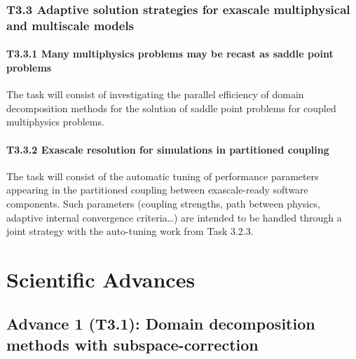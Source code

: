 \subsubsection*{T3.3 Adaptive solution strategies for exascale multiphysical and multiscale models}
\paragraph*{T3.3.1 Many multiphysics problems may be recast as saddle point problems}

 The task will
consist of investigating the parallel efficiency of domain decomposition methods for the solution of
saddle point problems for coupled multiphysics problems.

\paragraph*{T3.3.2 Exascale resolution for simulations in partitioned coupling}

 The task will consist of the
automatic tuning of performance parameters appearing in the partitioned coupling between
exascale-ready software components. Such parameters (coupling strengths, path between physics,
adaptive internal convergence criteria…) are intended to be handled through a joint strategy with the
auto-tuning work from Task 3.2.3.



\section{Scientific Advances}



 \subsection{ 
 Advance 1 (T3.1): Domain decomposition methods with subspace-correction 
 }
